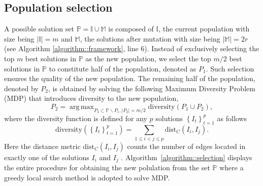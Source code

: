 \documentclass[12pt, a4paper]{article}%
\DeclareMathOperator*{\argmax}{\ensuremath{arg\,max}}
\newcommand{\dist}{\ensuremath{\mathrm{dist}}}
\numberwithin{equation}{section}
\theoremstyle{plain}
\begin{document}
			
			
			\subsection{Population selection}
			\label{sec::update}
			
			A possible solution set $\mathbb{P}=\mathbb{I}\cup\mathbb{M}$ is composed of $\mathbb{I}$, the current population with size being $|\mathbb{I}|=m$ and $\mathbb{M}$, the solutions after mutation with size being $|\mathbb{M}|=2r$ (see Algorithm \ref{algorithm::framework}, line 6). Instead of exclusively selecting the top $m$ best solutions in $\mathbb{P}$ as the new population, we select the top $m/2$ best solutions in $\mathbb{P}$ to constitute half of the population, denoted as $P_1$. Such selection ensures the quality of the new population.  The remaining half of the population, denoted by $P_2$,  
			is obtained by solving the following Maximum Diversity Problem (MDP) \cite{Duarte2006,Marti2013} that introduces diversity to the new population,  
			$$
			P_2 = \argmax_{P_2 \subset \mathbb{P} \backslash P_1, |P_2|=m/2} \text{diversity}(P_1 \cup P_2),
			$$
			where the diversity function is defined for any $p$ solutions $\left\{I_t\right\}_{t=1}^p$ as follows
			$$\text{diversity}\left(\left\{I_t\right\}_{t=1}^p\right) = \sum_{1 \leq i < j \leq p} \dist_C(I_i,I_j).$$
			Here the distance metric $\dist_C(I_i,I_j)$ counts the number of edges located in exactly one of the solutions $I_i$ and $I_j$ \cite{Marti2009}. Algorithm~\ref{algorithm::selection} displays the entire procedure for obtaining the new polulation from the set $\mathbb{P}$ where a greedy local search method is adopted to solve MDP.
			
			
			
			
\end{document}
